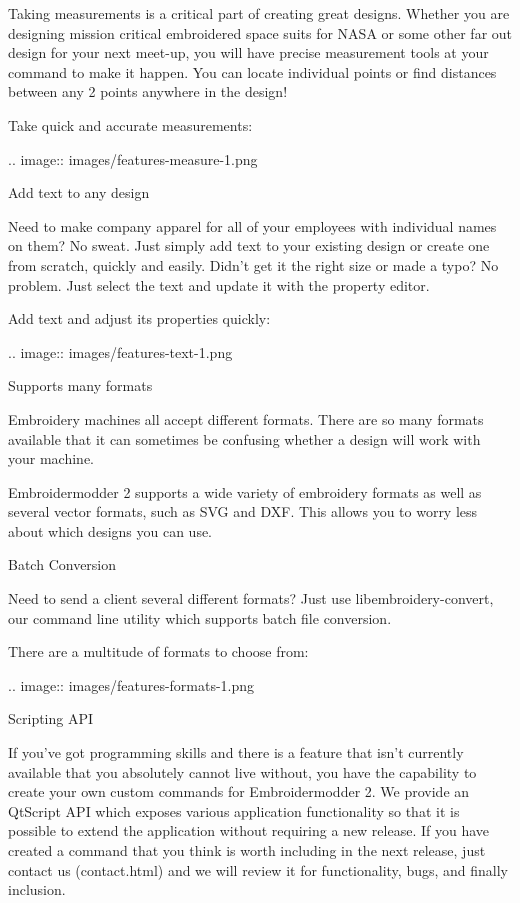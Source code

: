\documentclass[a4paper]{report}
\begin{document}
Taking measurements is a critical part of creating great designs. Whether you are designing
mission critical embroidered space suits for NASA or some other far out design for your next
meet-up, you will have precise measurement tools at your command to make it happen. You can
locate individual points or find distances between any 2 points anywhere in the design!

Take quick and accurate measurements:

.. image::
   images/features-measure-1.png

Add text to any design
~~~~~~~~~~~~~~~~~~~~~~

Need to make company apparel for all of your employees with individual names on them? No sweat.
Just simply add text to your existing design or create one from scratch, quickly and easily.
Didn't get it the right size or made a typo? No problem. Just select the text and update it
with the property editor.

Add text and adjust its properties quickly:

.. image::
   images/features-text-1.png

Supports many formats
~~~~~~~~~~~~~~~~~~~~~~

Embroidery machines all accept different formats. There are so many formats
available that it can sometimes be confusing whether a design will work with your machine.

Embroidermodder 2 supports a wide variety of embroidery formats as well as several vector
formats, such as SVG and DXF. This allows you to worry less about which designs you can use.

Batch Conversion
~~~~~~~~~~~~~~~~

Need to send a client several different formats? Just use libembroidery-convert, our command
line utility which supports batch file conversion.

There are a multitude of formats to choose from:

.. image::
   images/features-formats-1.png

Scripting API
~~~~~~~~~~~~~

If you've got programming skills and there is a feature that isn't currently available that you
absolutely cannot live without, you have the capability to create your own custom commands for
Embroidermodder 2. We provide an QtScript API which exposes various application functionality
so that it is possible to extend the application without requiring a new release. If you have
created a command that you think is worth including in the next release, just  contact
us (contact.html) and we will review it for functionality, bugs, and finally inclusion.
\end{document}
